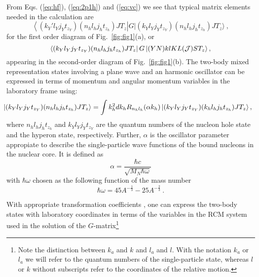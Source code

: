 {}From Eqs. (\ref{eq:hf}), (\ref{eq:2p1h}) and (\ref{eq:vc}) we see that
typical matrix elements needed in the calculation are
\begin{equation}
   \left\langle (k_{Y}'l_Yj_Yt_{z_Y})(n_hl_hj_ht_{z_h})JT_z\right |
    G | (k_{Y}l_{Y}j_{Y}t_{z_{Y}})(n_{h}l_{h}j_{h}
t_{z_{h}})JT_z \rangle \ ,
\label{eq:g1}
\end{equation}
for the first order diagram of Fig.~\ref{fig:fig1}(a), or
\begin{equation}
   \left\langle (k_Yl_Yj_Yt_{z_Y})(n_hl_hj_ht_{z_h})JT_z \right |
    G\left | (YN)klKL({\cal J})ST_z \right\rangle  ,
\label{eq:g2}
\end{equation}
appearing in the second-order diagram of Fig.~\ref{fig:fig1}(b).
The two-body mixed representation states involving a plane wave and an
harmonic oscillator can be
expressed in terms of momentum and angular
momentum variables in the laboratory frame using:
\begin{equation}
\hspace{-0.3cm}\left |
(k_Yl_Yj_Yt_{z_Y}) (n_hl_hj_ht_{z_h})JT_z
\right \rangle=
    \int k_h^2dk_hR_{n_hl_h}(\alpha k_h)
    \left | (k_Yl_Yj_Yt_{z_Y})(k_hl_hj_ht_{z_h})JT_z \right \rangle,
\label{eq:trans1}
\end{equation}
where $n_hl_hj_ht_{z_h}$ and $k_Yl_Yj_Yt_{z_Y}$ are the quantum numbers of the nucleon hole state
and the hyperon state, respectively. Further, $\alpha$ is the oscillator parameter appropiate 
to describe the single-particle wave functions of the bound
nucleons in the nuclear core. It is defined as
\begin{equation}
   \alpha=\frac{\hbar c}{\sqrt{M_{N}\hbar \omega}}
\label{eq:alfa}
\end{equation} 
with $\hbar \omega$ chosen as the following function of the mass number
\begin{equation} 
   \hbar \omega=45A^{-\frac{1}{3}}-25A^{-\frac{2}{3}} \ .
\label{eq:hachbar}
\end{equation} 


With appropriate transformation coefficients  \cite{kkr79,wc72},
one can express
the two-body states with laboratory coordinates in terms of the
variables in the RCM system used in the solution of the 
$G$-matrix\footnote{Note the distinction between
$k_a$ and $k$ and $l_a$ and $l$. With the notation $k_a$
or $l_a$ we will refer to the quantum numbers of the single-particle
state, whereas $l$ or $k$ without subscripts refer to the coordinates  
of the relative motion.}
 
